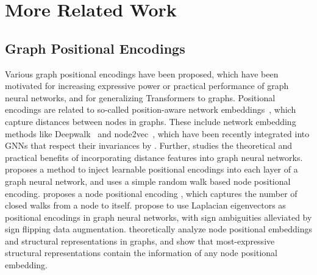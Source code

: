 \documentclass{article} \usepackage{iclr2023_conference,times}
\begin{document}
\section{More Related Work}\label{appendix:more_related}

\subsection{Graph Positional Encodings}

Various graph positional encodings have been proposed, which have been motivated for increasing expressive power or practical performance of graph neural networks, and for  generalizing Transformers to graphs. Positional encodings are related to so-called position-aware network embeddings~\citep{chami2020machine}, which capture distances between nodes in graphs. These include network embedding methods like Deepwalk~\citep{perozzi2014deepwalk} and node2vec~\citep{grover2016node2vec}, which have been recently integrated into GNNs that respect their invariances by \cite{wang2022equivariant}. Further, \cite{li2020distance} studies the theoretical and practical benefits of incorporating distance features into graph neural networks. \cite{dwivedi2022graph} proposes a method to inject learnable positional encodings into each layer of a graph neural network, and uses a simple random walk based node positional encoding. \cite{you2021identity} proposes a node positional encoding , which captures the number of closed walks from a node to itself. \cite{dwivedi2020benchmarking} propose to use Laplacian eigenvectors as positional encodings in graph neural networks, with sign ambiguities alleviated by sign flipping data augmentation. \cite{srinivasan2019equivalence} theoretically analyze node positional embeddings and structural representations in graphs, and show that most-expressive structural representations contain the information of any node positional embedding.
\end{document}
